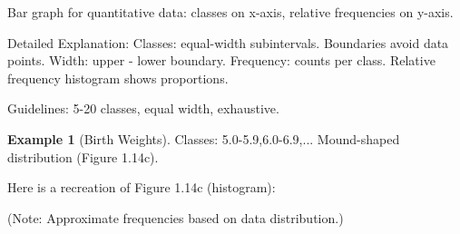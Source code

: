 \documentclass{article}
\theoremstyle{definition}
\newtheorem{example}{Example}
\begin{document}
	Bar graph for quantitative data: classes on x-axis, relative frequencies on y-axis.
	
	Detailed Explanation: Classes: equal-width subintervals. Boundaries avoid data points. Width: upper - lower boundary. Frequency: counts per class. Relative frequency histogram shows proportions.
	
	Guidelines: 5-20 classes, equal width, exhaustive.
	
	\begin{example}[Birth Weights]
		Classes: 5.0-5.9,6.0-6.9,... Mound-shaped distribution (Figure 1.14c).
		
		Here is a recreation of Figure 1.14c (histogram):
		
		(Note: Approximate frequencies based on data distribution.)
	\end{example}
\end{document}
